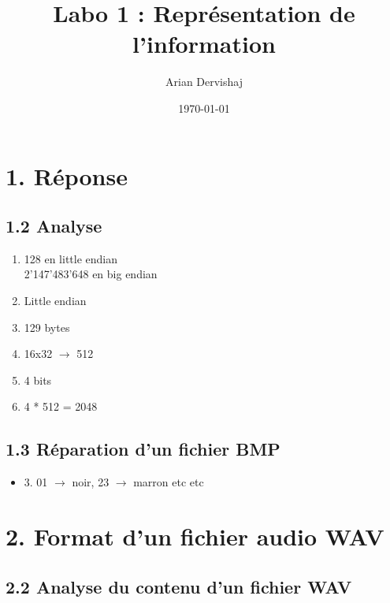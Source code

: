 \documentclass[a4paper, 12pt]{article}
\title{Labo 1 : Représentation de l'information}
\author{Arian Dervishaj}
\date{\today}
\begin{document}
\maketitle
\section*{1. Réponse}
\subsection*{1.2 Analyse}
\begin{enumerate}
    \item 128 en little endian\\ 
          2'147'483'648 en big endian
    \item Little endian
    \item 129 bytes
    \item 16x32 $\rightarrow$ 512
    \item 4 bits
    \item 4 * 512 = 2048

\end{enumerate}

\subsection*{1.3 Réparation d'un fichier BMP}
\begin{itemize}
    \item 3. 01 $\rightarrow$ noir, 23 $\rightarrow$ marron etc etc

\end{itemize}

\section*{2. Format d'un fichier audio WAV}
\subsection*{2.2 Analyse du contenu d'un fichier WAV}
\end{document}
